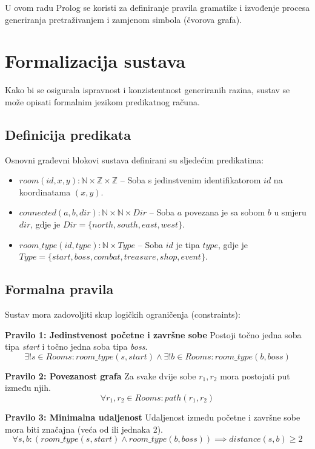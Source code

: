 \documentclass[]{foi}
\begin{document}
U ovom radu Prolog se koristi za definiranje pravila gramatike i izvođenje procesa generiranja pretraživanjem i zamjenom simbola (čvorova grafa).

\section{Formalizacija sustava}
Kako bi se osigurala ispravnost i konzistentnost generiranih razina, sustav se može opisati formalnim jezikom predikatnog računa.

\subsection{Definicija predikata}
Osnovni građevni blokovi sustava definirani su sljedećim predikatima:
\begin{itemize}
    \item $room(id, x, y): \mathbb{N} \times \mathbb{Z} \times \mathbb{Z}$ -- Soba s jedinstvenim identifikatorom $id$ na koordinatama $(x,y)$.
    \item $connected(a, b, dir): \mathbb{N} \times \mathbb{N} \times Dir$ -- Soba $a$ povezana je sa sobom $b$ u smjeru $dir$, gdje je $Dir = \{north, south, east, west\}$.
    \item $room\_type(id, type): \mathbb{N} \times Type$ -- Soba $id$ je tipa $type$, gdje je $Type = \{start, boss, combat, treasure, shop, event\}$.
\end{itemize}

\subsection{Formalna pravila}
Sustav mora zadovoljiti skup logičkih ograničenja (constraints):

\textbf{Pravilo 1: Jedinstvenost početne i završne sobe}
Postoji točno jedna soba tipa \textit{start} i točno jedna soba tipa \textit{boss}.
\begin{equation}
    \exists! s \in Rooms: room\_type(s, start) \land \exists! b \in Rooms: room\_type(b, boss)
\end{equation}

\textbf{Pravilo 2: Povezanost grafa}
Za svake dvije sobe $r_1, r_2$ mora postojati put između njih.
\begin{equation}
    \forall r_1, r_2 \in Rooms: path(r_1, r_2)
\end{equation}

\textbf{Pravilo 3: Minimalna udaljenost}
Udaljenost između početne i završne sobe mora biti značajna (veća od ili jednaka 2).
\begin{equation}
    \forall s, b: (room\_type(s, start) \land room\_type(b, boss)) \implies distance(s, b) \geq 2
\end{equation}
\end{document}
